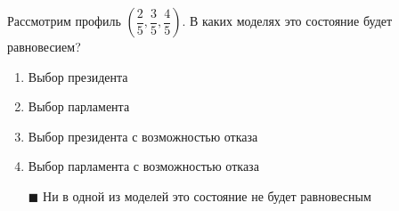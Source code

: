 \solution %

\task
Рассмотрим профиль $\left(\dfrac{2}{5}, \dfrac{3}{5}, \dfrac{4}{5}\right)$. В каких моделях это состояние будет равновесием?
\begin{enumerate}[label=$\square$]
	
	
	
	
	
	\item Выбор президента %
	\item Выбор парламента
	\item Выбор президента с возможностью отказа
	\item Выбор парламента с возможностью отказа
	\item[$\blacksquare$] Ни в одной из моделей это состояние не будет равновесным
\end{enumerate}

